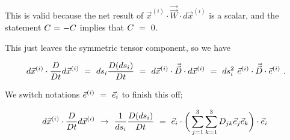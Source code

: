 \documentclass{article}
\begin{document}
This is valid because the net result of \begin{math} \vec{x}^{(i)} \cdot \vec{\vec{W}} \cdot d \vec{x}^{(i)} \end{math} is a scalar, and the statement \begin{math} C \hspace{0.025cm} = \hspace{0.025cm} - C \end{math} implies that \begin{math} C \hspace{0.125cm} = \hspace{0.125cm} 0 \end{math}. 

This just leaves the symmetric tensor component, so we have 

\begin{equation} \label{eq:1}
d \vec{x}^{(i)} \cdot \frac{D}{D t} d \vec{x}^{(i)} \hspace{0.125cm} = \hspace{0.125cm} ds_i \frac{D ( ds_i )}{D t} \hspace{0.125cm} = \hspace{0.125cm} d \vec{x}^{(i)} \cdot  \vec{\vec{D}} \cdot d \vec{x}^{(i)}  \hspace{0.125cm} = \hspace{0.125cm} ds_{i}^{2} \hspace{0.125cm} \vec{e}^{(i)} \cdot  \vec{\vec{D}} \cdot \vec{e}^{(i)} \hspace{0.125cm} . 
\end{equation} 

We switch notations \begin{math} \vec{e}^{(i)} \hspace{0.125cm} = \hspace{0.125cm} \vec{e}_i \end{math} to finish this off;

\begin{equation} \label{eq:1}
d \vec{x}^{(i)} \cdot \frac{D}{D t} d \vec{x}^{(i)} \hspace{0.125cm} \rightarrow \hspace{0.125cm} \frac{1}{ds_i} \frac{D ( ds_i )}{D t} \hspace{0.125cm} = \hspace{0.125cm}  \vec{e}_i \cdot \bigg( \sum_{j = 1}^{3} \sum_{k = 1}^{3} D_{j k} \vec{e}_j \vec{e}_k \bigg) \cdot \vec{e}_i \hspace{0.125cm} 
\end{equation} 
\end{document}
